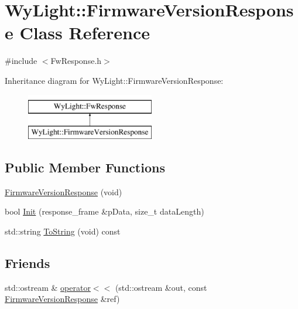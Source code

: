 \hypertarget{class_wy_light_1_1_firmware_version_response}{\section{Wy\-Light\-:\-:Firmware\-Version\-Response Class Reference}
\label{class_wy_light_1_1_firmware_version_response}
}


{\ttfamily \#include $<$Fw\-Response.\-h$>$}

Inheritance diagram for Wy\-Light\-:\-:Firmware\-Version\-Response\-:\begin{figure}[H]
\begin{center}
\leavevmode
\includegraphics[height=2.000000cm]{class_wy_light_1_1_firmware_version_response}
\end{center}
\end{figure}
\subsection*{Public Member Functions}
\begin{DoxyCompactItemize}
\item 
\hyperlink{class_wy_light_1_1_firmware_version_response_ac44161f34f697b6603248eb334e37330}{Firmware\-Version\-Response} (void)
\item 
bool \hyperlink{class_wy_light_1_1_firmware_version_response_ada5e917af8c5f256a11418fe5ba51211}{Init} (response\-\_\-frame \&p\-Data, size\-\_\-t data\-Length)
\item 
std\-::string \hyperlink{class_wy_light_1_1_firmware_version_response_a1c783d24e4ba46201d414664c4c33506}{To\-String} (void) const 
\end{DoxyCompactItemize}
\subsection*{Friends}
\begin{DoxyCompactItemize}
\item 
std\-::ostream \& \hyperlink{class_wy_light_1_1_firmware_version_response_a37b570544d9c72195251b87e598a0451}{operator$<$$<$} (std\-::ostream \&out, const \hyperlink{class_wy_light_1_1_firmware_version_response}{Firmware\-Version\-Response} \&ref)
\end{DoxyCompactItemize}


